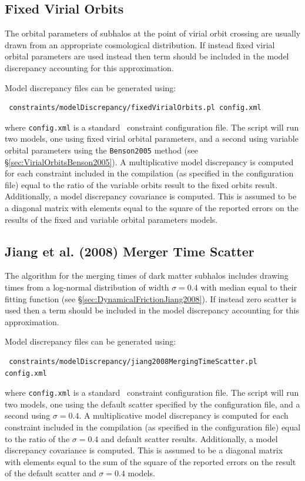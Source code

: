 \subsection{Fixed Virial Orbits}

The orbital parameters of subhalos at the point of virial orbit crossing are usually drawn from an appropriate cosmological distribution. If instead fixed virial orbital parameters are used instead then term should be included in the model discrepancy accounting for this approximation. 

Model discrepancy files can be generated using:
\begin{verbatim}
 constraints/modelDiscrepancy/fixedVirialOrbits.pl config.xml
\end{verbatim}
where {\tt config.xml} is a standard \glc\ constraint configuration file. The script will run two models, one using fixed virial orbital parameters, and a second using variable orbital parameters using the {\tt Benson2005} method (see \S\ref{sec:VirialOrbitsBenson2005}). A multiplicative model discrepancy is computed for each constraint included in the compilation (as specified in the configuration file) equal to the ratio of the variable orbits result to the fixed orbits result. Additionally, a model discrepancy covariance is computed. This is assumed to be a diagonal matrix with elements equal to the square of the reported errors on the results of the fixed and variable orbital parameters models.

\subsection{Jiang et al. (2008) Merger Time Scatter}

The \cite{jiang_fitting_2008} algorithm for the merging times of dark matter subhalos includes drawing times from a log-normal distribution of width $\sigma=0.4$ with median equal to their fitting function (see \S\ref{sec:DynamicalFrictionJiang2008}). If instead zero scatter is used then a term should be included in the model discrepancy accounting for this approximation. 

Model discrepancy files can be generated using:
\begin{verbatim}
 constraints/modelDiscrepancy/jiang2008MergingTimeScatter.pl config.xml
\end{verbatim}
where {\tt config.xml} is a standard \glc\ constraint configuration file. The script will run two models, one using the default scatter specified by the configuration file, and a second using $\sigma=0.4$. A multiplicative model discrepancy is computed for each constraint included in the compilation (as specified in the configuration file) equal to the ratio of the $\sigma=0.4$ and default scatter results. Additionally, a model discrepancy covariance is computed. This is assumed to be a diagonal matrix with elements equal to the sum of the square of the reported errors on the result of the default scatter and $\sigma=0.4$ models.

